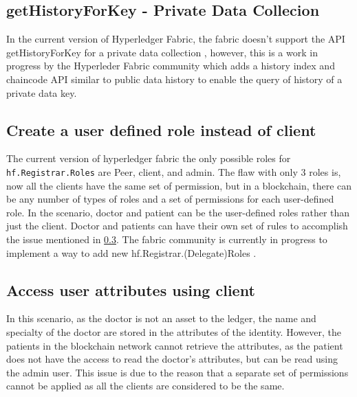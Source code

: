 \subsection{getHistoryForKey - Private Data Collecion}
\label{sec:results:issues:getHistoryForKey}
In the current version of Hyperledger Fabric, the fabric doesn't support the API getHistoryForKey for a private data collection \cite{jira-5094}, however, this is a work in progress by the Hyperleder Fabric community which adds a history index and chaincode API similar to public data history to enable the query of history of a private data key. 

\subsection{Create a user defined role instead of client}

The current version of hyperledger fabric the only possible roles for \lstinline{hf.Registrar.Roles}  are Peer, client, and admin. The flaw with only 3 roles is, now all the clients have the same set of permission, but in a blockchain, there can be any number of types of roles and a set of permissions for each user-defined role. In the scenario, doctor and patient can be the user-defined roles rather than just the client. Doctor and patients can have their own set of rules to accomplish the issue mentioned in \ref{sec:results:issues:Access}. The fabric community is currently in progress to implement a way to add new hf.Registrar.(Delegate)Roles \cite{jira-548}.

\subsection{Access user attributes using client}
\label{sec:results:issues:Access}
In this scenario, as the doctor is not an asset to the ledger, the name and specialty of the doctor are stored in the attributes of the identity. However, the patients in the blockchain network cannot retrieve the attributes, as the patient does not have the access to read the doctor's attributes, but can be read using the admin user. This issue is due to the reason that a separate set of permissions cannot be applied as all the clients are considered to be the same. 
%
%
